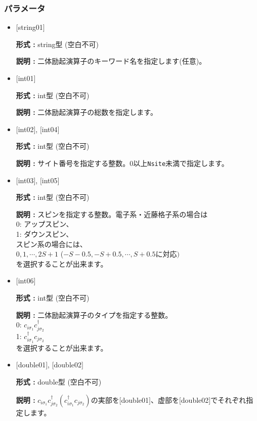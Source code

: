 \subsubsection{パラメータ}
 \begin{itemize}

   \item  $[$string01$]$
   
    {\bf 形式 :} string型 (空白不可)

   {\bf 説明 :} 二体励起演算子のキーワード名を指定します(任意)。

   \item  $[$int01$]$
   
    {\bf 形式 :} int型 (空白不可)

   {\bf 説明 :} 二体励起演算子の総数を指定します。

  \item  $[$int02$]$, $[$int04$]$

 {\bf 形式 :} int型 (空白不可)

{\bf 説明 :} サイト番号を指定する整数。0以上\verb|Nsite|{未満}で指定します。
 
  \item  $[$int03$]$, $[$int05$]$

 {\bf 形式 :} int型 (空白不可)

{\bf 説明 :} スピンを指定する整数。電子系・近藤格子系の場合は\\
0: アップスピン、\\
1: ダウンスピン、\\
スピン系の場合には、\\
$0, 1, \cdots, 2S+1$ ($-S-0.5, -S+0.5, \cdots, S+0.5$に対応$)$\\
を選択することが出来ます。


\item  $[$int06$]$

 {\bf 形式 :} int型 (空白不可)

{\bf 説明 :} 二体励起演算子のタイプを指定する整数。\\
0: $ c_{i\sigma_1}c_{j\sigma_2}^{\dagger}$\\
1: $ c_{i\sigma_1}^{\dagger}c_{j\sigma_2}$\\
を選択することが出来ます。

\item  $[$double01$]$, $[$double02$]$

 {\bf 形式 :} double型 (空白不可)

{\bf 説明 :} $ c_{i\sigma_1}c_{j\sigma_2}^{\dagger} ( c_{i\sigma_1}^{\dagger}c_{j\sigma_2})$の実部を$[$double01$]$、虚部を$[$double02$]$でそれぞれ指定します。

\end{itemize}

